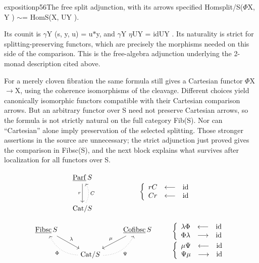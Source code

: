 \begin{dcomment}{exposition}{p56}{The free split adjunction, with its arrows specified}
Homsplit/S(\ensuremath{\Phi}X, Y ) \ensuremath{\sim}= HomS(X, UY ).

Its counit is \ensuremath{\gamma}Y (s, y, u) = u\ensuremath{*}y, and \ensuremath{\gamma}Y \ensuremath{\eta}UY = idUY . Its naturality is strict for splitting-preserving functors, which are precisely the morphisms needed on this side of the comparison. This is the free-algebra adjunction underlying the 2-monad description cited above.

For a merely cloven fibration the same formula still gives a Cartesian functor \ensuremath{\Phi}X \ensuremath{\to}X, using the coherence isomorphisms of the cleavage. Different choices yield canonically isomorphic functors compatible with their Cartesian comparison arrows. But an arbitrary functor over S need not preserve Cartesian arrows, so the formula is not strictly natural on the full category Fib(S). Nor can “Cartesian” alone imply preservation of the selected splitting. Those stronger assertions in the source are unnecessary; the strict adjunction just proved gives the comparison in Fibsc(S), and the next block explains what survives after localization for all functors over S.

\end{dcomment}


\[
\begin{tikzcd}[row sep=large]
\ul{Parf}\,S \arrow[d, "r"'] \\
\mathrm{Cat}/S \arrow[u, dotted, bend right, "C"']
\end{tikzcd}
\qquad\qquad\qquad
\left\{\begin{array}{lcl}
rC & \longleftarrow & \mathrm{id} \\
Cr & \longleftarrow & \mathrm{id}
\end{array}\right.
\]

\[
\begin{tikzcd}
\ul{Fibsc}\,S \arrow[dr, "\lambda"] & & \ul{Cofibsc}\,S \arrow[dl, "\mu"'] \\
& \mathrm{Cat}/S \arrow[ul, dotted, bend left, "\Phi"] \arrow[ur, dotted, bend right, "\Psi"'] &
\end{tikzcd}
\qquad
\begin{array}{l}
\left\{\begin{array}{lcl}
\lambda\Phi & \longleftarrow & \mathrm{id} \\
\Phi\lambda & \longrightarrow & \mathrm{id}
\end{array}\right. \\[2ex]
\left\{\begin{array}{lcl}
\mu\Psi & \longleftarrow & \mathrm{id} \\
\Psi\mu & \longrightarrow & \mathrm{id}
\end{array}\right.
\end{array}
\]

